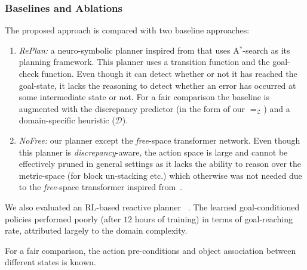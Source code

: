 \subsubsection{Baselines and Ablations}\label{subsec:baseline}
The proposed approach is compared with two baseline approaches: \begin{enumerate}
    \item \emph{RePlan:} a neuro-symbolic planner inspired from \cite{mao2022pdsketch} that uses A$^*$-search as its planning framework. This planner uses a transition function and the goal-check function. Even though it can detect whether or not it has reached the goal-state, it lacks the reasoning to detect whether an error has occurred at some intermediate state or not. For a fair comparison the baseline is augmented with the discrepancy predictor (in the form of our $=_\mathcal{Z}$) and a domain-specific heuristic ($\mathcal{D}$).
    \item \emph{NoFree:} our planner except the \textit{free}-space transformer network. Even though this planner is \textit{discrepancy}-aware, the action space is large and cannot be effectively pruned in general settings as it lacks the ability to reason over the metric-space (for block un-stacking etc.) which otherwise was not needed due to the \textit{free}-space transformer inspired from~\citep{liu2022structdiffusion}.
\end{enumerate}

We also evaluated an RL-based reactive planner ~\citep{li2020towards}. The learned goal-conditioned policies performed poorly (after $12$ hours of training) in terms of goal-reaching rate, attributed largely to the domain complexity. 

For a fair comparison, the action pre-conditions and object association between different states is known. 

